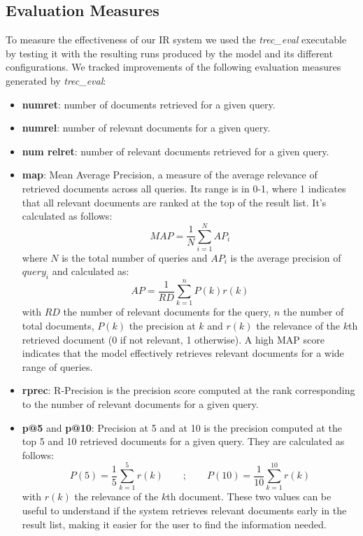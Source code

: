 \subsection{Evaluation Measures}
To measure the effectiveness of our \ac{IR} system we used the \textit{trec\_eval} executable by testing it with the resulting runs produced by the model and its different configurations.
\newline
We tracked improvements of the following evaluation measures generated by \textit{trec\_eval}:
\begin{itemize}
	\item \textbf{num\textunderscore ret}: number of documents retrieved for a given query.
	\item \textbf{num\textunderscore rel}: number of relevant documents for a given query.
	\item \textbf{num \textunderscore rel\textunderscore ret}: number of relevant documents retrieved for a given query.
    \item \textbf{map}: Mean Average Precision, a measure of the average relevance of retrieved documents across all queries. Its range is in 0-1, where 1 indicates that all relevant documents are ranked at the top of the result list.
    \newline
    It's calculated as follows:
    \begin{equation*}
        MAP = \frac{1}{N} \sum_{i=1}^{N}AP_i
    \end{equation*}
    where $N$ is the total number of queries and $AP_i$ is the average precision of $query_i$ and calculated as:
    \begin{equation*}
        AP = \frac{1}{RD} \sum_{k=1}^{n}P(k)r(k)
    \end{equation*}
    with $RD$ the number of relevant documents for the query, $n$ the number of total documents, $P(k)$ the precision at $k$ and $r(k)$ the relevance of the $k$th retrieved document (0 if not relevant, 1 otherwise).
    \newline
    A high \ac{MAP} score indicates that the model effectively retrieves relevant documents for a wide range of queries.
    \item \textbf{rprec}: R-Precision is the precision score computed at the rank corresponding to the number of relevant documents for a given query.
    \item \textbf{p@5} and \textbf{p@10}: Precision at 5 and at 10 is the precision computed at the top 5 and 10 retrieved documents for a given query.
    They are calculated as follows:
    \begin{equation*}
        P(5) = \frac{1}{5} \sum_{k=1}^{5}r(k) \qquad ; \qquad P(10) = \frac{1}{10} \sum_{k=1}^{10}r(k)
    \end{equation*}
    with $r(k)$ the relevance of the $k$th document.
    \newline
    These two values can be useful to understand if the system retrieves relevant documents early in the result list, making it easier for the user to find the information needed.

\end{itemize}

